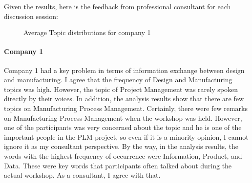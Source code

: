 \documentclass[senior]{IPSstyle}
\begin{document}
Given the results, here is the feedback from professional consultant for each discussion session:

\begin{figure}[h]
    \begin{center}
    \end{center}
\vspace{-0.3cm}
    \caption{Average Topic distributions for company 1}
    \label{fig_c1}
    \vspace{-0.3cm}
\end{figure} 

\paragraph{Company 1} Company 1 had a key problem in terms of information exchange between design and manufacturing. I agree that the frequency of Design and Manufacturing topics was high. However, the topic of Project Management was rarely spoken directly by their voices. In addition, the analysis results show that there are few topics on Manufacturing Process Management. Certainly, there were few remarks on Manufacturing Process Management when the workshop was held. However, one of the participants was very concerned about the topic and he is one of the important people in the PLM project, so even if it is a minority opinion, I cannot ignore it as my consultant perspective. By the way, in the analysis results, the words with the highest frequency of occurrence were Information, Product, and Data. These were key words that participants often talked about during the actual workshop. As a consultant, I agree with that.
\end{document}
